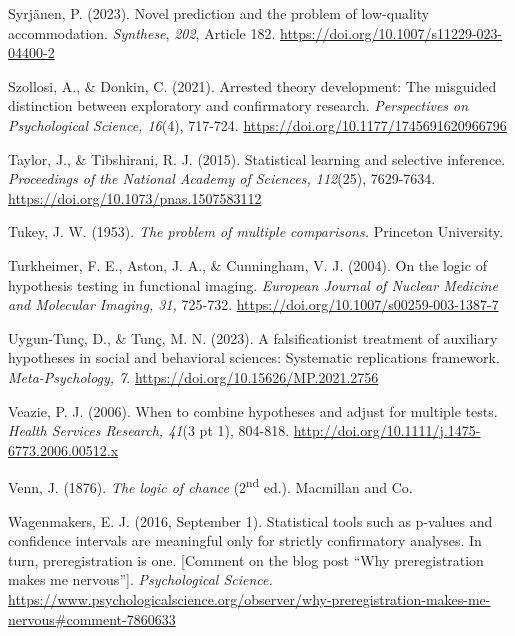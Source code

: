 \documentclass[authordate, meta]{jote-new-article}
\begin{document}
	Syrjänen, P. (2023). Novel prediction and the problem of low-quality accommodation. \emph{Synthese}, \emph{202}, Article 182. \url{https://doi.org/10.1007/s11229-023-04400-2}



	Szollosi, A., \& Donkin, C. (2021). Arrested theory development: The misguided distinction between exploratory and confirmatory research. \emph{Perspectives on Psychological Science, 16}(4), 717-724. \url{https://doi.org/10.1177/1745691620966796}



	Taylor, J., \& Tibshirani, R. J. (2015). Statistical learning and selective inference. \emph{Proceedings of the National Academy of Sciences, 112}(25), 7629-7634. \url{https://doi.org/10.1073/pnas.1507583112}



	Tukey, J. W. (1953). \emph{The problem of multiple comparisons.} Princeton University.



	Turkheimer, F. E., Aston, J. A., \& Cunningham, V. J. (2004). On the logic of hypothesis testing in functional imaging. \emph{European Journal of Nuclear Medicine and Molecular Imaging, 31, }725-732. \url{https://doi.org/10.1007/s00259-003-1387-7}



	Uygun-Tunç, D., \& Tunç, M. N. (2023). A falsificationist treatment of auxiliary hypotheses in social and behavioral sciences: Systematic replications framework. \emph{Meta-Psychology, 7}. \url{https://doi.org/10.15626/MP.2021.2756}



	Veazie, P. J. (2006). When to combine hypotheses and adjust for multiple tests. \emph{Health Services Research, 41}(3 pt 1), 804-818. \url{http://doi.org/10.1111/j.1475-6773.2006.00512.x}



	Venn, J. (1876). \emph{The logic of chance} (2\textsuperscript{nd} ed.). Macmillan and Co.



	Wagenmakers, E. J. (2016, September 1). Statistical tools such as p-values and confidence intervals are meaningful only for strictly confirmatory analyses. In turn, preregistration is one. [Comment on the blog post “Why preregistration makes me nervous”]. \emph{Psychological Science.} \url{https://www.psychologicalscience.org/observer/why-preregistration-makes-me-nervous\#comment-7860633}
\end{document}
